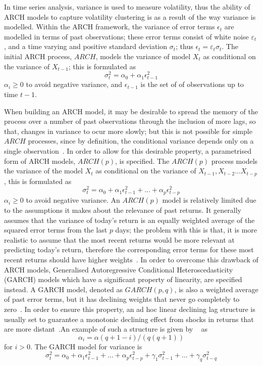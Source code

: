 \documentclass[13pt]{report}
\begin{document}
In time series analysis, variance is used to measure volatility, thus the ability of ARCH  models to capture volatility clustering is as a result of the way variance is modelled. Within the ARCH framework, the variance of  error terms $\epsilon_{t}$ are modelled in terms of past observations; these error terms consist of white noise $\varepsilon_{t}$, and a time varying and positive standard deviation $\sigma_{t}$; thus $\epsilon_{t}=\varepsilon_{t}\sigma_{t}$.  The initial ARCH process, $ARCH$, models the variance of model $X_{t}$ as conditional on the variance of $X_{t-1}$; this is formulated as \[\sigma_{t}^{2}=\alpha_{0}+\alpha_{1}\epsilon_{t-1}^{2}\] $\alpha_{i}\geq 0$ to avoid negative variance, and $\epsilon_{t-1}$ is the set of of observations up to time $t-1$.\par 

When building an ARCH model, it may be desirable to spread the memory of the process over a number of past observations through the inclusion of more lags, so that, changes in variance to ocur more slowly; but this is not possible for simple $ARCH$ processes, since by definition, the conditional variance depends only on a single observation~\cite{satchell2011forecasting}. In order to allow for this desirable property, a parametrised form of ARCH models, $ARCH(p)$, is specified. The $ARCH(p)$ process models the variance of the model $X_{t}$ as conditional on the variance of $X_{t-1}, X_{t-2}...X_{t-p}$, this is formulated as \[\sigma_{t}^{2}=\alpha_{0}+\alpha_{1}\epsilon_{t-1}^{2}+...+\alpha_{p}\epsilon_{t-p}^{2}\] $\alpha_{i}\geq 0$ to avoid negative variance. An $ARCH(p)$ model is relatively limited due to the assumptions it makes about the relevance of past returns. It generally assumes that the variance of today's return is an equally weighted average of the squared error terms from the last $p$ days; the problem with this is that, it is more realistic to assume that the most recent returns would be more relevant at predicting today's return, therefore the corresponding error terms for these most recent returns should have higher weights~\cite{engle2001garch}. In order to overcome this drawback of ARCH models, Generalised Autoregressive Conditional Heteroscedasticity (GARCH) models which have a significant property of linearity, are specified instead. A GARCH model, denoted as   $GARCH(p,q)$, is also a weighted average of past error terms, but it has declining weights that never go completely to zero~\cite{engle2001garch}. In order to ensure this property, an ad hoc linear declining lag structure is usually set to guarantee a monotonic declining effect from shocks in returns that are more distant~\cite{satchell2011forecasting}.An example of such a structure is given by ~\cite{satchell2011forecasting} as \[\alpha_{i}=\alpha(q+1-i)/(q(q+1))\] for $i>0$. The GARCH model for variance is \[\sigma_{t}^{2}=\alpha_{0}+\alpha_{1}\epsilon_{t-1}^{2}+...+\alpha_{p}\epsilon_{t-p}^{2}+\gamma_{1}\sigma_{t-1}^{2}+...+\gamma_{q}\sigma_{t-q}^{2}\]\par
\end{document}
